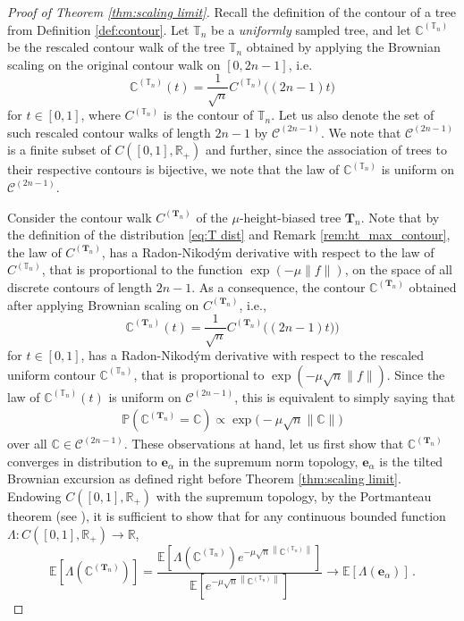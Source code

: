 \documentclass{article}
\newcommand{\pr}{\mathbb{P}}								%
\newcommand{\Prob}[1]{\pr\left(#1\right)}					%
\newcommand{\E}{\mathbb{E}}								%
\newcommand{\Exp}[1]{\E\left[#1\right]}					%
\newcommand{\1}{\mathbbm{1}}								%
\theoremstyle{definition}
\numberwithin{equation}{section}
\newcommand{\bT}{\mathbf T}
\newcommand{\cC}{\mathcal C}
\newcommand{\T}{\mathbb T}
\newcommand{\C}{\mathbb C}
\newcommand{\R}{\mathbb R}
\begin{document}
\begin{proof}[Proof of Theorem \ref{thm:scaling limit}]

Recall the definition of the contour of a tree from Definition \ref{def:contour}. Let $\T_n$ be a \textit{uniformly} sampled tree, and let $\C^{(\T_n)}$ be the rescaled contour walk of the tree $\T _n$ obtained by applying the Brownian scaling on the original contour walk on $[0,2n-1]$, i.e.
$$\C^{(\T_n)}(t)=\frac{1}{\sqrt{n}}C^{(\T_n)}\big((2n-1)t\big)$$
for $t \in [0,1]$, where $C^{(\T_n)}$ is the contour of $\T_n$.
Let us also denote the set of such rescaled contour walks of length $2n-1$ by $\cC^{(2n-1)}$.
We note that $\cC^{(2n-1)}$ is a finite subset of $C([0,1],\R_+)$ and further, since the association of trees to their respective contours is bijective, we note that the law of $\C^{(\T_n)}$ is uniform on $\cC^{(2n-1)}$. 



Consider the contour walk $C^{(\bT_n)}$ of the $\mu$-height-biased tree $\bT_n$. Note that by the definition of the distribution \eqref{eq:T dist} and Remark \ref{rem:ht_max_contour}, the law of $C^{(\bT_n)}$, has a Radon-Nikodým derivative with respect to the law of $C^{(\T_n)}$, that is proportional to the function $\exp(-\mu \|f\|)$, on the space of all discrete contours of length $2n-1$. As a consequence, the contour $\C^{(\bT_n)}$ obtained after applying Brownian scaling on $C^{(\bT_n)}$, i.e.,
$$\C^{(\bT_n)} (t)=\frac{1}{\sqrt{n}}C^{(\bT_n)} \big( (2n-1)t) \big)$$
for $t \in [0,1]$, has a Radon-Nikodým derivative with respect to the rescaled uniform contour $\C^{(\T_n)}$, that is proportional to $\exp{(-\mu \sqrt{n} \|f\|)}$. Since the law of $\C^{(\T_n)}(t)$ is uniform on $\cC^{(2n-1)}$, this is equivalent to simply saying that
\begin{align*}
    \Prob{\C^{(\bT_n)} = \C} \propto \exp\Big(-\mu \sqrt{n}\big\|\C\big\|\Big)
\end{align*}
over all $\C \in \cC ^{(2n-1)}$.
{These observations at hand, let us first} show that $\C^{(\bT_n)}$ converges in distribution to $\mathbf{e}_{\alpha}$ in the supremum norm topology, {$\mathbf{e}_{\alpha}$ is the tilted Brownian excursion as defined right before Theorem \ref{thm:scaling limit}}. {Endowing $C([0,1],\R_+)$ with the supremum topology,} by the Portmanteau theorem (see \cite{klenke2008probability}), it is sufficient to show that for any continuous bounded function
$\Lambda: C([0,1],\R_+) \to \R$,
$$\E\left[\Lambda\left(\C^{(\bT_n)}\right)\right]= \frac{\Exp{\Lambda(\C^{(\T_n)}) e^{-\mu \sqrt{n}  \left\|\C^{(\T_n)}\right\|}}}{\Exp{e^{-\mu \sqrt{n} \left\|\C^{(\T_n)}\right\|}}} \longrightarrow \Exp{\Lambda(\mathbf{e}_{\alpha})} \, .$$ 


\end{proof}
\end{document}
